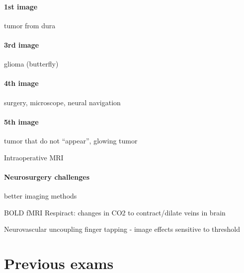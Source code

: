 \documentclass[12pt,article,oneside,a4paper]{memoir}
\begin{document}
\paragraph{1st image} tumor from dura
\paragraph{3rd image} glioma (butterfly)
\paragraph{4th image} surgery, microscope, neural navigation
\paragraph{5th image} tumor that do not ``appear'', glowing tumor

Intraoperative MRI

\paragraph{Neurosurgery challenges} better imaging methods

BOLD fMRI
Respiract: changes in CO2 to contract/dilate veins in brain

Neurovascular uncoupling
finger tapping - image effects
sensitive to threshold


\newpage
\section{Previous exams}
\end{document}
